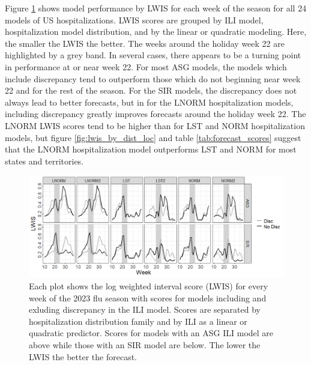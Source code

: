 Figure \ref{fig:us_lwis} shows model performance by LWIS for each week of the 
season for all 24 models of US hospitalizations. LWIS scores are grouped by 
ILI model, hospitalization model distribution, and by the linear or quadratic 
modeling. Here, the smaller the LWIS the better. The weeks around the holiday 
week 22 are highlighted by a grey band. 
In several cases, there appears to be a turning point in performance at or 
near week 22. For most ASG models, the models which include discrepancy tend 
to outperform those which do not beginning near week 22 and for the rest of 
the season.
For the SIR models, the discrepancy does not always lead to better forecasts, 
but in for the LNORM hospitalization models, including discrepancy greatly 
improves forecasts around the holiday week 22. The LNORM LWIS scores tend to 
be higher than for LST and NORM hospitalization models, but figure 
\ref{fig:lwis_by_dist_loc} and table \ref{tab:forecast_scores} suggest that 
the LNORM hospitalization model outperforms LST and NORM for most states and 
territories.



\begin{figure}[hbt!]
    
    \includegraphics[scale = .6]{Images/lwis_ln_us_full_season.png}
    \caption{Each plot shows the log weighted interval score (LWIS) for every 
    week of the 2023 flu season with scores for models including and exluding 
    discrepancy in the ILI model. Scores are separated by hospitalization 
    distribution family and by ILI as a linear or quadratic predictor. Scores 
    for models with an ASG ILI model are above while those with an SIR model 
    are below. The lower the LWIS the better the forecast.}
    \label{fig:us_lwis}
\end{figure}

%     



